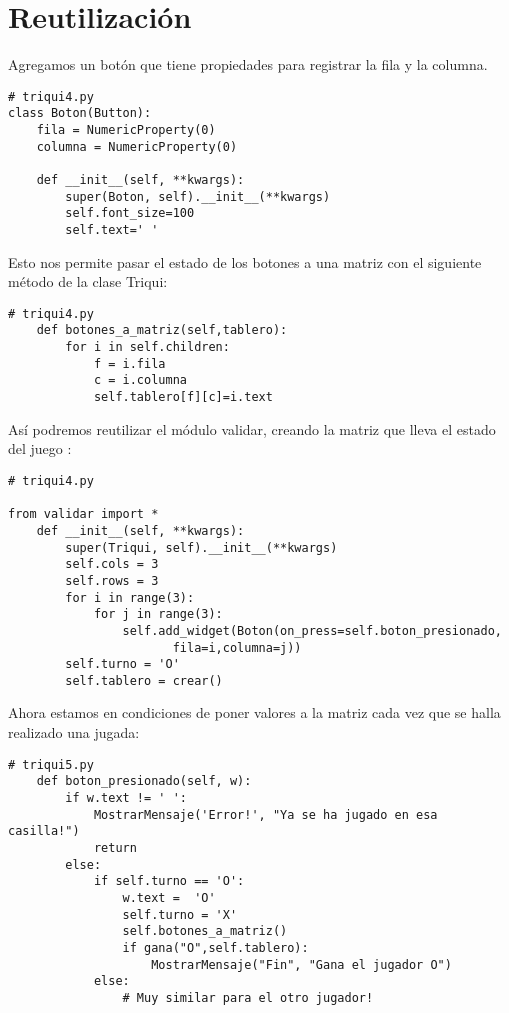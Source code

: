 \section{Reutilización}

Agregamos un botón que tiene propiedades para 
registrar la fila y la columna.
\beforeverb
\begin{verbatim}
# triqui4.py
class Boton(Button):
    fila = NumericProperty(0)
    columna = NumericProperty(0)
    
    def __init__(self, **kwargs):      
        super(Boton, self).__init__(**kwargs)
        self.font_size=100
        self.text=' '
\end{verbatim}
\afterverb
        
Esto nos permite pasar el estado de los botones a una matriz con 
el siguiente método de la clase Triqui:

\beforeverb
\begin{verbatim}
# triqui4.py
    def botones_a_matriz(self,tablero):
        for i in self.children:
            f = i.fila
            c = i.columna
            self.tablero[f][c]=i.text
\end{verbatim}
\afterverb

Así podremos reutilizar el módulo validar, creando la matriz
que lleva el estado del juego :

\beforeverb
\begin{verbatim}
# triqui4.py

from validar import *
    def __init__(self, **kwargs):
        super(Triqui, self).__init__(**kwargs)
        self.cols = 3
        self.rows = 3
        for i in range(3):
            for j in range(3):
                self.add_widget(Boton(on_press=self.boton_presionado,
                       fila=i,columna=j))
        self.turno = 'O'
        self.tablero = crear()
\end{verbatim}
\afterverb

Ahora estamos en condiciones de poner valores a la matriz 
cada vez que se halla realizado una jugada:

\beforeverb
\begin{verbatim}
# triqui5.py
    def boton_presionado(self, w):
        if w.text != ' ':
            MostrarMensaje('Error!', "Ya se ha jugado en esa casilla!")
            return
        else:
            if self.turno == 'O':
                w.text =  'O'                
                self.turno = 'X'
                self.botones_a_matriz()
                if gana("O",self.tablero):
                    MostrarMensaje("Fin", "Gana el jugador O")
            else:
                # Muy similar para el otro jugador!
\end{verbatim}
\afterverb

